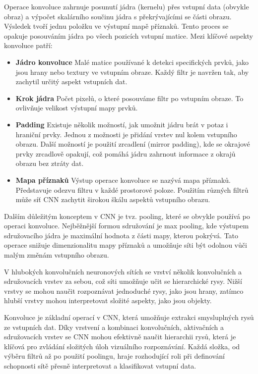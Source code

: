 \documentclass[male,czech,api_ing]{thesis}
\begin{document}
Operace konvoluce zahrnuje posunutí jádra (kernelu) přes vstupní data (obvykle obraz) a výpočet skalárního součinu jádra s překrývajícími se části obrazu. Výsledek tvoří jednu položku ve výstupní mapě příznaků. Tento proces se opakuje posouváním jádra po všech pozicích vstupní matice. Mezi klíčové aspekty konvoluce patří:

\begin{itemize}
    \item \textbf{Jádro konvoluce} Malé matice používané k detekci specifických prvků, jako jsou hrany nebo textury ve vstupním obraze. Každý filtr je navržen tak, aby zachytil určitý aspekt vstupních dat.
    \item \textbf{Krok jádra} Počet pixelů, o které posouváme filtr po vstupním obraze. To ovlivňuje velikost výstupní mapy prvků.
    \item \textbf{Padding} Existuje několik možností, jak umožnit jádru brát v potaz i hraniční prvky. Jednou z možnosti je přidání vrstev nul kolem vstupního obrazu. Další možností je použití zrcadlení (mirror padding), kde se okrajové prvky zrcadlově opakují, což pomáhá jádru zahrnout informace z okrajů obrazu bez ztráty dat.
    \item \textbf{Mapa příznaků} Výstup operace konvoluce se nazývá mapa příznaků. Představuje odezvu filtru v každé prostorové poloze. Použitím různých filtrů může síť CNN zachytit širokou škálu aspektů vstupního obrazu.
\end{itemize}

Dalším důležitým konceptem v CNN je tvz. pooling, které se obvykle používá po operaci konvoluce. Nejběžnější formou sdružování je max pooling, kde výstupem sdružovacího jádra je maximální hodnota z části mapy, kterou pokrývá. Tato operace snižuje dimenzionalitu mapy příznaků a umožňuje síti být odolnou vůči malým změnám vstupního obrazu.

V hlubokých konvolučních neuronových sítích se vrství několik konvolučních a sdružovacích vrstev za sebou, což síti umožňuje učit se hierarchické rysy. Nižší vrstvy se mohou naučit rozpoznávat jednoduché rysy, jako jsou hrany, zatímco hlubší vrstvy mohou interpretovat složité aspekty, jako jsou objekty.

Konvoluce je základní operací v CNN, která umožňuje extrakci smysluplných rysů ze vstupních dat. Díky vrstvení a kombinaci konvolučních, aktivačních a sdružovacích vrstev se CNN mohou efektivně naučit hierarchii rysů, která je klíčová pro zvládání složitých úloh vizuálního rozpoznávání. Každá složka, od výběru filtrů až po použití poolingu, hraje rozhodující roli při definování schopnosti sítě přesně interpretovat a klasifikovat vstupní data. \cite{CNNConcepts, CNNConcepts2}
\end{document}
